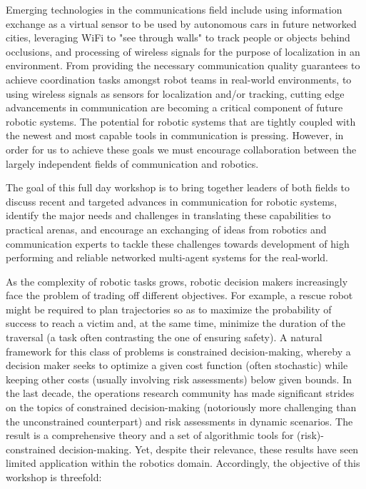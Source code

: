 \begin{spacing}{1.0}
{Emerging technologies in the communications field include using information exchange as a virtual sensor to be used by autonomous cars in future networked cities, leveraging WiFi to "see through walls" to track people or objects behind occlusions, and processing of wireless signals for the purpose of localization in an environment. From providing the necessary communication quality guarantees to achieve coordination tasks amongst robot teams in real-world environments, to using wireless signals as sensors for localization and/or tracking, cutting edge advancements in communication are becoming a critical component of future robotic systems. The potential for robotic systems that are tightly coupled with the newest and most capable tools in communication is pressing. However, in order for us to achieve these goals we must encourage collaboration between the largely independent fields of communication and robotics.

The goal of this full day workshop is to bring together leaders of both fields to discuss recent and targeted advances in communication for robotic systems, identify the major needs and challenges in translating these capabilities to practical arenas, and encourage an exchanging of ideas from robotics and communication experts to tackle these challenges towards development of high performing and reliable networked multi-agent systems for the real-world.

}



{
As the complexity of robotic tasks grows, robotic decision makers increasingly face the problem of trading off different objectives. For example, a rescue robot might be required to plan trajectories so as to maximize the probability of success to reach a victim and, at the same time, minimize the duration of the traversal (a task often contrasting the one of ensuring safety). A natural framework for this class of problems is constrained decision-making, whereby a decision maker seeks to optimize a given cost function (often stochastic) while keeping other costs (usually involving risk assessments) below given bounds. In the last decade, the operations research community has made significant strides on the topics of constrained decision-making (notoriously more challenging than the unconstrained counterpart) and risk assessments in dynamic scenarios. The result is a comprehensive theory and a set of algorithmic tools for (risk)-constrained decision-making. Yet, despite their relevance, these results have seen limited application within the robotics domain. Accordingly, the objective of this workshop is threefold: 

}
\end{spacing}
